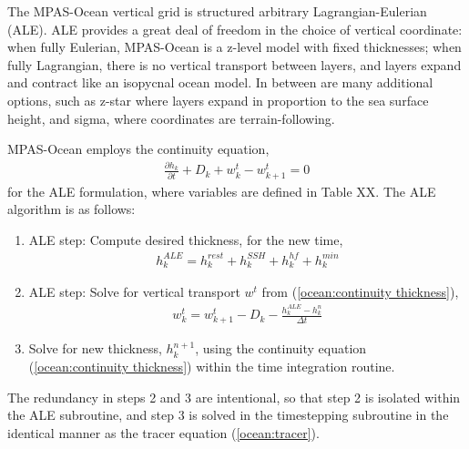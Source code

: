 The MPAS-Ocean vertical grid is structured arbitrary Lagrangian-Eulerian (ALE).   ALE provides a great deal of freedom in the choice of vertical coordinate: when fully Eulerian, MPAS-Ocean is a z-level model with fixed thicknesses; when fully Lagrangian, there is no vertical transport between layers, and layers expand and contract like an isopycnal ocean model.  In between are many additional options, such as z-star where layers expand in proportion to the sea surface height, and sigma, where coordinates are terrain-following.

MPAS-Ocean employs the continuity equation,
\begin{eqnarray}
\label{ocean:continuity thickness}
\frac{\partial h_{k}}{\partial t} + D_k + w^t_k - w^t_{k+1} =0
\end{eqnarray}
for the ALE formulation, where variables are defined in Table XX.  The ALE algorithm is as follows:
\begin{enumerate}
\item ALE step: Compute desired thickness, for the new time,
\begin{eqnarray}
\label{ocean:desired thickness}
h_k^{ALE} = h_k^{rest} + h_k^{SSH} + h_k^{hf} + h_k^{min}
\end{eqnarray}
\item ALE step: Solve for vertical transport $w^t$ from (\ref{ocean:continuity thickness}),
\begin{eqnarray}
\label{ocean:vert tranport}
w^t_k = w^t_{k+1} - D_k - \frac{h^{ALE}_k - h^n_k}{\Delta t}
\end{eqnarray}
\item Solve for new thickness, $h_{k}^{n+1}$, using the continuity equation (\ref{ocean:continuity thickness}) within the time integration routine.
\end{enumerate}
The redundancy in steps 2 and 3 are intentional, so that step 2 is isolated within the ALE subroutine, and step 3 is solved in the timestepping subroutine in the identical manner as the tracer equation (\ref{ocean:tracer}).


